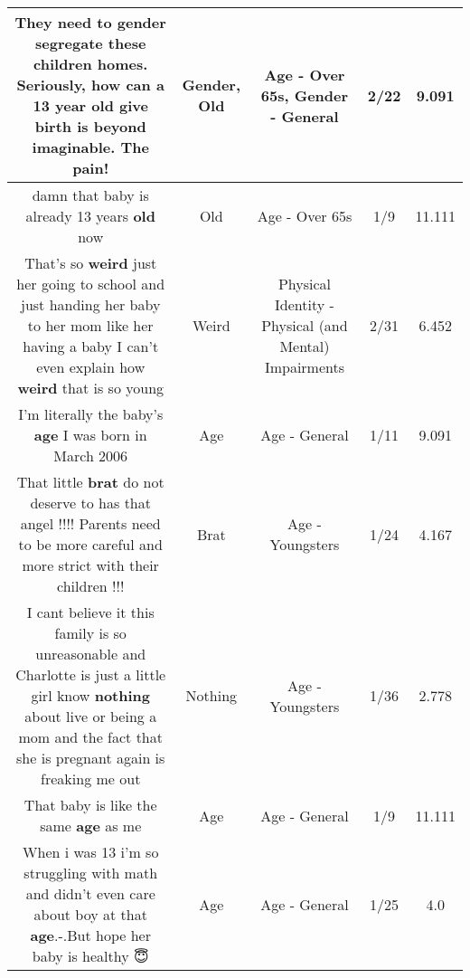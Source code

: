 \documentclass[11pt]{article}
\newlength\mylength
\begin{document}
\begin{center}
\begin{longtable}{|C{.65\mylength}|C{.30\mylength}|C{.12\mylength}|C{.12\mylength}|C{.12\mylength}|}
  \small They need to \textbf{gender} segregate these children homes. Seriously, how can a 13 year \textbf{old} give birth is beyond imaginable. The pain!\normalsize   & Gender, Old & Age - Over 65s, Gender - General & 2/22 & 9.091 \\  \hline
  \small damn that baby is already 13 years \textbf{old} now\normalsize   & Old & Age - Over 65s & 1/9 & 11.111 \\  \hline
  \small That's so \textbf{weird} just her going to school and just handing her baby to her mom like her having a baby I can't even explain how \textbf{weird} that is so young\normalsize   & Weird & Physical Identity - Physical (and Mental) Impairments & 2/31 & 6.452 \\  \hline
  \small I'm literally the baby's \textbf{age} I was born in March 2006\normalsize   & Age & Age - General & 1/11 & 9.091 \\  \hline
  \small That little \textbf{brat} do not deserve to has that angel !!!! Parents need to be more careful and more strict with their children !!!\normalsize   & Brat & Age - Youngsters & 1/24 & 4.167 \\  \hline
  \small I cant believe it this family is so unreasonable and Charlotte is just a little girl know \textbf{nothing} about live or being a mom and the fact that she is pregnant again is freaking me out\normalsize   & Nothing & Age - Youngsters & 1/36 & 2.778 \\  \hline
  \small That baby is like the same \textbf{age} as me\normalsize   & Age & Age - General & 1/9 & 11.111 \\  \hline
  \small When i was 13 i'm so struggling with math and didn't even care about boy at that \textbf{age}.-.But hope her baby is healthy 😇\normalsize   & Age & Age - General & 1/25 & 4.0 \\  \hline

\end{longtable}
\end{center}
\end{document}
